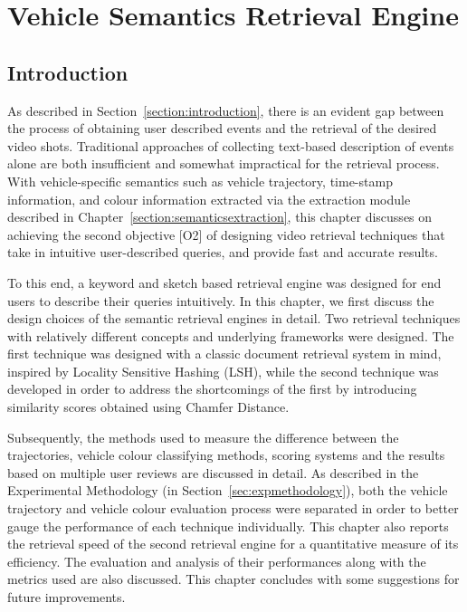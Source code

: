 
\chapter{Vehicle Semantics Retrieval Engine}

\label{section:retrievalengine}
\section{Introduction}

As described in Section~\ref{section:introduction}, there is an evident gap between the process of obtaining user described events and the retrieval of the desired video shots. Traditional approaches of collecting text-based description of events alone are both insufficient and somewhat impractical for the retrieval process.
With vehicle-specific semantics such as vehicle trajectory, time-stamp information, and colour information extracted via the extraction module described in Chapter~\ref{section:semanticsextraction}, this chapter discusses on achieving the second objective [O2] of designing video retrieval techniques that take in intuitive user-described queries, and provide fast and accurate results.

To this end, a keyword and sketch based retrieval engine was designed for end users to describe their queries intuitively. In this chapter, we first discuss the design choices of the semantic retrieval engines in detail. Two retrieval techniques with relatively different concepts and underlying frameworks were designed. 
The first technique was designed with a classic document retrieval system in mind, inspired by Locality Sensitive Hashing (LSH), while the second technique was developed in order to address the shortcomings of the first by introducing similarity scores obtained using Chamfer Distance.

Subsequently, the methods used to measure the difference between the
trajectories, vehicle colour classifying methods, scoring systems and the results based on multiple user reviews are discussed in detail.
As described in the Experimental Methodology (in Section~\ref{sec:expmethodology}),
both the vehicle trajectory and vehicle colour evaluation process were separated in order to better gauge the performance of each technique individually.
This chapter also reports the retrieval speed of the second retrieval engine for a quantitative measure of its efficiency.
The evaluation and analysis of their performances along with the metrics used are also discussed. This chapter concludes with some
suggestions for future improvements.

